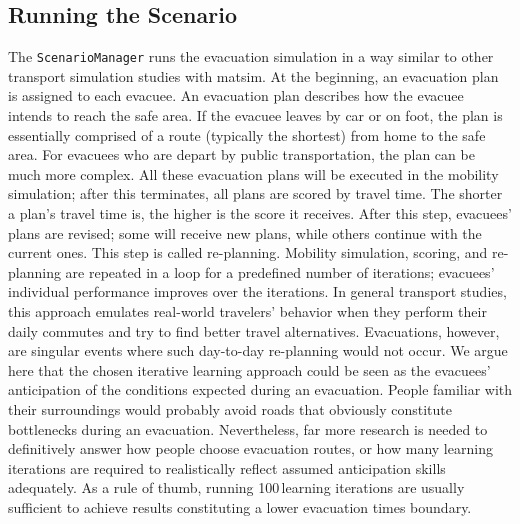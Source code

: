 \subsection{Running the Scenario}
The \lstinline|ScenarioManager| runs the evacuation simulation in a way similar to other transport simulation studies with \gls{matsim}. 
At the beginning, an evacuation plan is assigned to each evacuee. 
An evacuation plan describes how the evacuee intends to reach the safe area.
If the evacuee leaves by car or on foot, the plan is essentially comprised of a route (typically the shortest) from home to the safe area. For evacuees who are depart by public transportation, the plan can be much more complex. All these evacuation plans will be executed in the mobility simulation; after this terminates, all plans are scored by travel time. 
The shorter a plan's travel time is, the higher is the score it receives. After this step, evacuees' plans are revised; some will receive new plans, while others continue with the current ones. This step is called re-planning. Mobility simulation, scoring, and re-planning are repeated in a loop for a predefined number of iterations; evacuees' individual performance improves over the iterations. 
In general transport studies, this approach emulates real-world travelers' behavior when they perform their daily commutes and try to find better travel alternatives. Evacuations, however, are singular events where such day-to-day re-planning would not occur. We argue here that the chosen iterative learning approach could be seen as the evacuees' anticipation of the conditions expected during an evacuation. 
People familiar with their surroundings would probably avoid roads that obviously constitute bottlenecks during an evacuation. Nevertheless, far more research is needed to definitively answer how people choose evacuation routes, or how many learning iterations are required to realistically reflect assumed anticipation skills adequately. As a rule of thumb, running 100\,learning iterations are usually sufficient to achieve results constituting a lower evacuation times boundary.   


